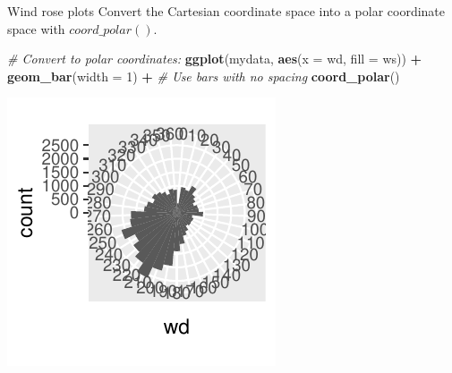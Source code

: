 \documentclass[
  ignorenonframetext,
]{beamer}
\newenvironment{Shaded}{\begin{snugshade}}{\end{snugshade}}
\newcommand{\AttributeTok}[1]{\textcolor[rgb]{0.13,0.29,0.53}{#1}}
\newcommand{\CommentTok}[1]{\textcolor[rgb]{0.56,0.35,0.01}{\textit{#1}}}
\newcommand{\DecValTok}[1]{\textcolor[rgb]{0.00,0.00,0.81}{#1}}
\newcommand{\FunctionTok}[1]{\textcolor[rgb]{0.13,0.29,0.53}{\textbf{#1}}}
\newcommand{\NormalTok}[1]{#1}
\newcommand{\SpecialCharTok}[1]{\textcolor[rgb]{0.81,0.36,0.00}{\textbf{#1}}}
\begin{document}
\begin{frame}[fragile]{Wind rose plots}
\label{wind-rose-plots-3}
Convert the Cartesian coordinate space into a polar coordinate space
with \(coord\_polar()\).


\begin{Shaded}
\begin{Highlighting}[]
\CommentTok{\# Convert to polar coordinates:}
\FunctionTok{ggplot}\NormalTok{(mydata, }\FunctionTok{aes}\NormalTok{(}\AttributeTok{x =}\NormalTok{ wd, }\AttributeTok{fill =}\NormalTok{ ws)) }\SpecialCharTok{+} 
  \FunctionTok{geom\_bar}\NormalTok{(}\AttributeTok{width =} \DecValTok{1}\NormalTok{) }\SpecialCharTok{+}  \CommentTok{\# Use bars with no spacing}
  \FunctionTok{coord\_polar}\NormalTok{()}
\end{Highlighting}
\end{Shaded}

\begin{center}\includegraphics[width=0.5\linewidth]{Figs/unnamed-chunk-70-1} \end{center}
\end{frame}
\end{document}
